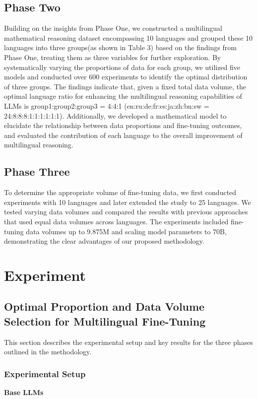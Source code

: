 \documentclass[11pt]{article}
\begin{document}
\subsection{Phase Two}
Building on the insights from Phase One, we constructed a multilingual mathematical reasoning dataset encompassing 10 languages and grouped these 10 languages into three groups(as shown in Table 3) based on the findings from Phase One, treating them as three variables for further exploration. By systematically varying the proportions of data for each group, we utilized five models and conducted over 600 experiments to identify the optimal distribution of three groups. The findings indicate that, given a fixed total data volume, the optimal language ratio for enhancing the multilingual reasoning capabilities of LLMs is group1:group2:group3 = 4:4:1 (en:ru:de:fr:es:ja:zh:bn:sw
= 24:8:8:8:1:1:1:1:1:1). Additionally, we developed a mathematical model to elucidate the relationship between data proportions and fine-tuning outcomes, and evaluated the contribution of each language to the overall improvement of multilingual reasoning.


\subsection{Phase Three}
To determine the appropriate volume of fine-tuning data, we first conducted experiments with 10 languages and later extended the study to 25 languages. We tested varying data volumes and compared the results with previous approaches that used equal data volumes across languages. The experiments included fine-tuning data volumes up to 9.875M and scaling model parameters to 70B, demonstrating the clear advantages of our proposed methodology.


\section{Experiment}

\subsection{Optimal Proportion and Data Volume Selection for Multilingual Fine-Tuning}
This section describes the experimental setup and key results for the three phases outlined in the methodology.

\subsubsection{Experimental Setup} 
\textbf{Base LLMs}
\end{document}
